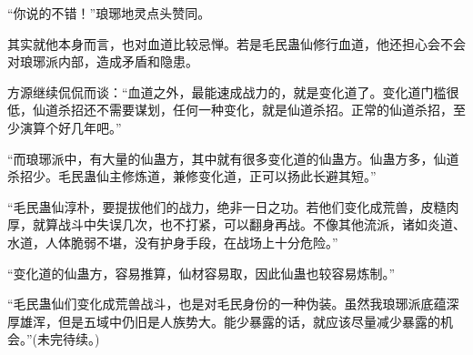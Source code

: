 \begin{this_body}
“你说的不错！”琅琊地灵点头赞同。

其实就他本身而言，也对血道比较忌惮。若是毛民蛊仙修行血道，他还担心会不会对琅琊派内部，造成矛盾和隐患。

方源继续侃侃而谈：“血道之外，最能速成战力的，就是变化道了。变化道门槛很低，仙道杀招还不需要谋划，任何一种变化，就是仙道杀招。正常的仙道杀招，至少演算个好几年吧。”

“而琅琊派中，有大量的仙蛊方，其中就有很多变化道的仙蛊方。仙蛊方多，仙道杀招少。毛民蛊仙主修炼道，兼修变化道，正可以扬此长避其短。”

“毛民蛊仙淳朴，要提拔他们的战力，绝非一日之功。若他们变化成荒兽，皮糙肉厚，就算战斗中失误几次，也不打紧，可以翻身再战。不像其他流派，诸如炎道、水道，人体脆弱不堪，没有护身手段，在战场上十分危险。”

“变化道的仙蛊方，容易推算，仙材容易取，因此仙蛊也较容易炼制。”

“毛民蛊仙们变化成荒兽战斗，也是对毛民身份的一种伪装。虽然我琅琊派底蕴深厚雄浑，但是五域中仍旧是人族势大。能少暴露的话，就应该尽量减少暴露的机会。”(未完待续。)

\end{this_body}

